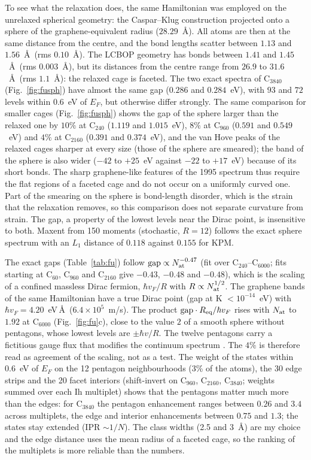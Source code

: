 \documentclass[reprint,nofootinbib,superscriptaddress,amsmath,amssymb,aps,prb,floatfix]{revtex4-2}
\begin{document}
To see what the relaxation does, the same Hamiltonian was employed on the unrelaxed spherical geometry: the Caspar--Klug construction projected onto a sphere of the graphene-equivalent radius ($28.29$~\AA). All atoms are then at the same distance from the centre, and the bond lengths scatter between $1.13$ and $1.56$~\AA\ (rms $0.10$~\AA). The LCBOP geometry has bonds between $1.41$ and $1.45$~\AA\ (rms $0.003$~\AA), but its distances from the centre range from $26.9$ to $31.6$~\AA\ (rms $1.1$~\AA): the relaxed cage is faceted. The two exact spectra of C$_{3840}$ (Fig.~\ref{fig:fusph}) have almost the same gap ($0.286$ and $0.284$~eV), with $93$ and $72$ levels within $0.6$~eV of $E_F$, but otherwise differ strongly. The same comparison for smaller cages (Fig.~\ref{fig:fusph}) shows the gap of the sphere larger than the relaxed one by $10\%$ at C$_{240}$ ($1.119$ and $1.015$~eV), $8\%$ at C$_{960}$ ($0.591$ and $0.549$~eV) and $4\%$ at C$_{2160}$ ($0.391$ and $0.374$~eV), and the van Hove peaks of the relaxed cages sharper at every size (those of the sphere are smeared); the band of the sphere is also wider ($-42$ to $+25$~eV against $-22$ to $+17$~eV) because of its short bonds. The sharp graphene-like features of the 1995 spectrum thus require the flat regions of a faceted cage and do not occur on a uniformly curved one. Part of the smearing on the sphere is bond-length disorder, which is the strain that the relaxation removes, so this comparison does not separate curvature from strain. The gap, a property of the lowest levels near the Dirac point, is insensitive to both. Maxent from 150 moments (stochastic, $R=12$) follows the exact sphere spectrum with an $L_1$ distance of $0.118$ against $0.155$ for KPM.

The exact gaps (Table~\ref{tab:fu}) follow $\mathrm{gap}\propto N_{\rm at}^{-0.47}$ (fit over C$_{240}$--C$_{6000}$; fits starting at C$_{60}$, C$_{960}$ and C$_{2160}$ give $-0.43$, $-0.48$ and $-0.48$), which is the scaling of a confined massless Dirac fermion, $\hbar v_F/R$ with $R\propto N_{\rm at}^{1/2}$.
The graphene bands of the same Hamiltonian have a true Dirac point (gap at K $<10^{-14}$~eV) with $\hbar v_F=4.20$~eV\,\AA\ ($6.4\times10^5$~m/s). The product $\mathrm{gap}\cdot R_{\rm eq}/\hbar v_F$ rises with $N_{\rm at}$ to $1.92$ at C$_{6000}$ (Fig.~\ref{fig:fu}c), close to the value $2$ of a smooth sphere without pentagons, whose lowest levels are $\pm\hbar v/R$. The twelve pentagons carry a fictitious gauge flux that modifies the continuum spectrum \cite{gonzalez1992,gonzalez1993}. The $4\%$ is therefore read as agreement of the scaling, not as a test.
The weight of the states within $0.6$~eV of $E_F$ on the 12 pentagon neighbourhoods (3\% of the atoms), the 30 edge strips and the 20 facet interiors (shift-invert on C$_{960}$, C$_{2160}$, C$_{3840}$; weights summed over each Ih multiplet) shows that the pentagons matter much more than the edges: for C$_{3840}$ the pentagon enhancement ranges between $0.26$ and $3.4$ across multiplets, the edge and interior enhancements between $0.75$ and $1.3$; the states stay extended (IPR $\sim1/N$).
The class widths (2.5 and 3~\AA) are my choice and the edge distance uses the mean radius of a faceted cage, so the ranking of the multiplets is more reliable than the numbers.
\end{document}
